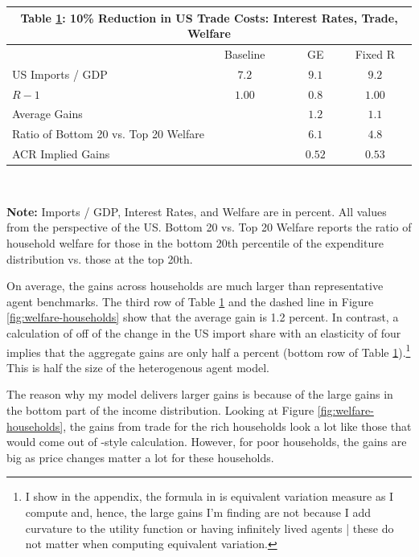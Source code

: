 \documentclass[12pt,pdftex]{article}
\renewcommand{\arraystretch}{1.1}
\begin{document}
\begin{onehalfspacing}
\begin{table}[t]
\small
\begin{center}
\setlength {\tabcolsep}{5.75mm}
\renewcommand{\arraystretch}{1.60}\label{tb-welfare}
\begin{tabular}[t]{l c c c}
\multicolumn{4}{c}{{\normalsize\textbf{Table \ref{tb-welfare}: 10\% Reduction in US Trade Costs: Interest Rates, Trade, Welfare}} }
\\ \hline \hline
& Baseline & GE & Fixed R \\
\cmidrule(lr){2-2} \cmidrule(lr){3-3} \cmidrule(lr){4-4}
US Imports / GDP & $7.2$ & $9.1$ & $9.2$  \\
$R - 1$ & $1.00$ & $0.8$ & $1.00$  \\
\hline
\multicolumn{2}{l}{Average Gains} & $1.2$ & $1.1$\\
\multicolumn{2}{l}{Ratio of Bottom 20 vs. Top 20 Welfare} & $6.1$ & $4.8$\\
\multicolumn{2}{l}{ACR Implied Gains } & $0.52$ & $0.53$ \\
\hline
\end{tabular}
\\[0.5ex]
\parbox{5.75in}{\footnotesize \textbf{Note:} Imports / GDP, Interest Rates, and Welfare are in percent. All values from the perspective of the US. Bottom 20 vs. Top 20 Welfare reports the ratio of household welfare for those in the bottom 20th percentile of the expenditure distribution vs. those at the top 20th.}
\end{center}
\end{table}

On average, the gains across households are much larger than representative agent benchmarks. The third row of Table \ref{tb-welfare} and the dashed line in Figure \ref{fig:welfare-households} show that the average gain is 1.2 percent. In contrast, a calculation of \citet{arkolakis2012new} off of the change in the US import share with an elasticity of four implies that the aggregate gains are only half a percent (bottom row of Table \ref{tb-welfare}).\footnote{I show in the appendix, the formula in \citet{arkolakis2012new} is equivalent variation measure as I compute and, hence, the large gains I'm finding are not because I add curvature to the utility function or having infinitely lived agents | these do not matter when computing equivalent variation.} This is half the size of the heterogenous agent model.

The reason why my model delivers larger gains is because of the large gains in the bottom part of the income distribution. Looking at Figure \ref{fig:welfare-households}, the gains from trade for the rich households look a lot like those that would come out of \citet{arkolakis2012new}-style calculation. However, for poor households, the gains are big as price changes matter a lot for these households.


\end{onehalfspacing}
\end{document}
